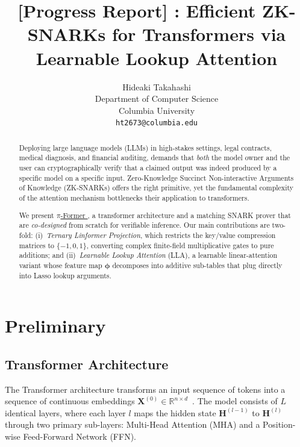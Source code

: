 \documentclass{article}
\title{%
  [Progress Report] \sys: Efficient ZK-SNARKs for Transformers
  via Learnable Lookup Attention%
}
\author{
Hideaki Takahashi \\
Department of Computer Science \\
Columbia University \\
\texttt{ht2673@columbia.edu}
}
\newcommand{\RR}{\mathbb{R}}          %
\newcommand{\bphi}{\boldsymbol{\phi}} %
\newcommand{\bX}{\mathbf{X}}
\newcommand{\bH}{\mathbf{H}}
\newcommand{\sys}{{$\pi$-Former }}
\begin{document}
\maketitle

\begin{abstract}

Deploying large language models (LLMs) in high-stakes settings, legal
contracts, medical diagnosis, and financial auditing, demands that \emph{both} the model owner and the user can cryptographically verify that a claimed output was indeed produced by a specific model on a specific input.  Zero-Knowledge Succinct Non-interactive Arguments of
Knowledge (ZK-SNARKs) offers the right primitive, yet the fundamental complexity of the attention mechanism bottlenecks their application to transformers.

We present \underline{\sys}, a transformer architecture and a matching SNARK prover that are \emph{co-designed} from scratch for verifiable inference.  Our main contributions are two-fold: (i)~\emph{Ternary Linformer Projection}, which restricts the key/value
compression matrices to $\{-1,0,1\}$, converting complex finite-field multiplicative
gates to pure additions; and (ii)~\emph{Learnable Lookup Attention} (LLA), a learnable linear-attention variant whose feature map $\bphi$ decomposes into additive sub-tables that plug directly into Lasso lookup arguments. 


\end{abstract}

\section{Preliminary}

\subsection{Transformer Architecture}
The Transformer architecture transforms an input sequence of tokens into a sequence of continuous embeddings $\bX^{(0)} \in \RR^{n \times d}$~\cite{vaswani2017attention}. The model consists of $L$ identical layers, where each layer $l$ maps the hidden state $\bH^{(l-1)}$ to $\bH^{(l)}$ through two primary sub-layers: Multi-Head Attention (MHA) and a Position-wise Feed-Forward Network (FFN).
\end{document}
